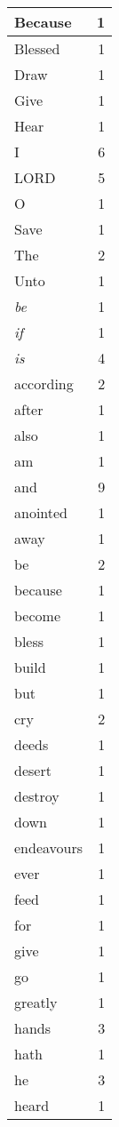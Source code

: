 \begin{center}
\begin{longtable}{l|r}
\hline \hline
\endlastfoot
Because & 1 \\ \hline
Blessed & 1 \\ \hline
Draw & 1 \\ \hline
Give & 1 \\ \hline
Hear & 1 \\ \hline
I & 6 \\ \hline
LORD & 5 \\ \hline
O & 1 \\ \hline
Save & 1 \\ \hline
The & 2 \\ \hline
Unto & 1 \\ \hline
\emph{be} & 1 \\ \hline
\emph{if} & 1 \\ \hline
\emph{is} & 4 \\ \hline
according & 2 \\ \hline
after & 1 \\ \hline
also & 1 \\ \hline
am & 1 \\ \hline
and & 9 \\ \hline
anointed & 1 \\ \hline
away & 1 \\ \hline
be & 2 \\ \hline
because & 1 \\ \hline
become & 1 \\ \hline
bless & 1 \\ \hline
build & 1 \\ \hline
but & 1 \\ \hline
cry & 2 \\ \hline
deeds & 1 \\ \hline
desert & 1 \\ \hline
destroy & 1 \\ \hline
down & 1 \\ \hline
endeavours & 1 \\ \hline
ever & 1 \\ \hline
feed & 1 \\ \hline
for & 1 \\ \hline
give & 1 \\ \hline
go & 1 \\ \hline
greatly & 1 \\ \hline
hands & 3 \\ \hline
hath & 1 \\ \hline
he & 3 \\ \hline
heard & 1 \\ \hline

\end{longtable}
\end{center}
